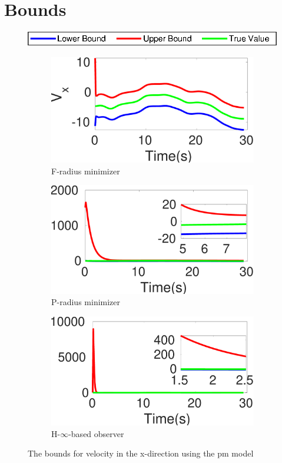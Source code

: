 \section{Bounds}
\begin{figure}[h]
\centering \includegraphics[scale=0.8]{figures/legend}\\
\begin{subfigure}{0.32\textwidth}
\centering
\includegraphics[width=\linewidth]{figures/sm}\caption{F-radius minimizer}
\end{subfigure}
\begin{subfigure}{0.32\linewidth}
\centering
\includegraphics[width=\linewidth]{figures/prad}\caption{P-radius minimizer}
\end{subfigure}
\begin{subfigure}{0.32\linewidth}
\centering
\includegraphics[width=\linewidth]{figures/hinf}\caption{H-$\infty$-based observer}
\end{subfigure}
\caption{The bounds for velocity in the x-direction using the pm model}
\label{fig:bound}
\end{figure}
